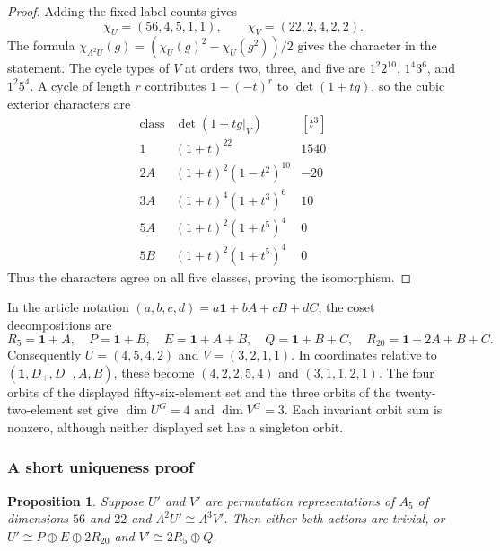 \documentclass[11pt,a4paper]{article}
\newtheorem{proposition}{Proposition}[section]
\begin{document}
\begin{proof}
Adding the fixed-label counts gives
\[
\chi_U=(56,4,5,1,1),\qquad
\chi_V=(22,2,4,2,2).
\]
The formula $\chi_{\Lambda^2U}(g)
=(\chi_U(g)^2-\chi_U(g^2))/2$ gives the character in the statement.
The cycle types of $V$ at orders two, three, and five are
$1^2 2^{10}$, $1^4 3^6$, and $1^2 5^4$. A cycle of length $r$
contributes $1-(-t)^r$ to $\det(1+tg)$, so the cubic exterior characters are
\[
\begin{array}{c|c|r}
\text{class}&\det(1+tg|_V)&[t^3]\\\hline
1&(1+t)^{22}&1540\\
2A&(1+t)^2(1-t^2)^{10}&-20\\
3A&(1+t)^4(1+t^3)^6&10\\
5A&(1+t)^2(1+t^5)^4&0\\
5B&(1+t)^2(1+t^5)^4&0
\end{array}
\]
Thus the characters agree on all five classes, proving the isomorphism.
\end{proof}

In the article notation $(a,b,c,d)=a\mathbf1+bA+cB+dC$, the coset
decompositions are
\[
R_5=\mathbf1+A,\quad P=\mathbf1+B,\quad
E=\mathbf1+A+B,\quad Q=\mathbf1+B+C,\quad
R_{20}=\mathbf1+2A+B+C.
\]
Consequently $U=(4,5,4,2)$ and $V=(3,2,1,1)$. In coordinates relative to $(\mathbf1,D_+,D_-,A,B)$, these become
$(4,2,2,5,4)$ and $(3,1,1,2,1)$. The four orbits of the displayed
fifty-six-element set and the three orbits of the twenty-two-element set
give $\dim U^G=4$ and $\dim V^G=3$. Each invariant orbit sum is nonzero,
although neither displayed set has a singleton orbit.

\subsubsection*{A short uniqueness proof}

\begin{proposition}\label{prop:faces-unique}
Suppose $U'$ and $V'$ are permutation representations of $A_5$ of
dimensions $56$ and $22$ and
$\Lambda^2U'\cong\Lambda^3V'$. Then either both actions are trivial,
or $U'\cong P\oplus E\oplus2R_{20}$ and $V'\cong2R_5\oplus Q$.
\end{proposition}
\end{document}
